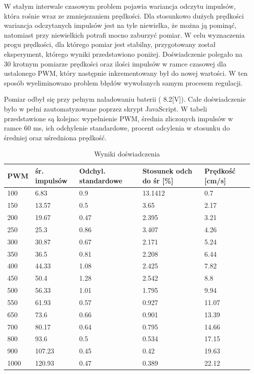 \documentclass[eng,printmode]{mgr}
\begin{document}
W stałym interwale czasowym problem pojawia wariancja odczytu impulsów, która rośnie wraz ze zmniejszaniem prędkości. Dla stosunkowo dużych prędkości wariancja odczytanych impulsów jest na tyle niewielka, że można ją pominąć, natomiast przy niewielkich potrafi mocno zaburzyć pomiar. W celu wyznaczenia progu prędkości, dla którego pomiar jest stabilny, przygotowany został eksperyment, którego wyniki przedstawiono poniżej. Doświadczenie polegało na 30 krotnym pomiarze prędkości oraz ilości impulsów w ramce czasowej dla ustalonego PWM, który następnie inkrementowany był do nowej wartości. W ten sposób wyeliminowano problem błędów wywołanych samym procesem regulacji. 

Pomiar odbył się przy pełnym naładowaniu baterii ( 8.2[V]). Całe doświadczenie było w pełni zautomatyzowane poprzez skrypt JavaScript. W tabeli przedstawione są kolejno: wypełnienie PWM, średnia zliczonych impulsów w ramce  60 ms, ich odchylenie standardowe, procent odcylenia w stosunku do średniej oraz uśredniona prędkość.

\begin{table}[ht]
\centering
\begin{adjustbox}{width=1\textwidth}
\begin{tabular}{ | l | l | l | l | l | }
\hline
	PWM & śr. impulsów & Odchyl. standardowe & Stosunek odch do śr [\%] & Prędkość [cm/s]  \\ \hline
	100 & 6.83 & 0.9 & 13.1412 & 0.7 \\ \hline
	150 & 13.57 & 0.5 & 3.65 & 2.17 \\ \hline
	200 & 19.67 & 0.47 & 2.395 & 3.21 \\ \hline
	250 & 25.3 & 0.86 & 3.407 & 4.26 \\ \hline
	300 & 30.87 & 0.67 & 2.171 & 5.24 \\ \hline
	350 & 36.5 & 0.81 & 2.208 & 6.44 \\ \hline
	400 & 44.33 & 1.08 & 2.425 & 7.82 \\ \hline
	450 & 50.4 & 1.28 & 2.542 & 8.8 \\ \hline
	500 & 56.33 & 1.01 & 1.795 & 9.94 \\ \hline
	550 & 61.93 & 0.57 & 0.927 & 11.07 \\ \hline
	650 & 73.6 & 0.66 & 0.901 & 13.39 \\ \hline
	700 & 80.17 & 0.64 & 0.795 & 14.66 \\ \hline
	800 & 93.6 & 0.5 & 0.534 & 17.15 \\ \hline
	900 & 107.23 & 0.45 & 0.42 & 19.63 \\ \hline
	1000 & 120.93 & 0.47 & 0.389 & 22.12 \\ \hline
\end{tabular}
\end{adjustbox}
\caption{Wyniki doświadczenia} 
\end{table}
\end{document}

